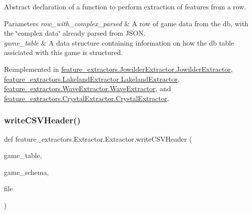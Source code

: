 Abstract declaration of a function to perform extraction of features from a row. 


\begin{DoxyParams}{Parameters}
{\em row\+\_\+with\+\_\+complex\+\_\+parsed} & A row of game data from the db, with the \char`\"{}complex data\char`\"{} already parsed from J\+S\+ON. \\
\hline
{\em game\+\_\+table} & A data structure containing information on how the db table assiciated with this game is structured. \\
\hline
\end{DoxyParams}


Reimplemented in \mbox{\hyperlink{classfeature__extractors_1_1_jowilder_extractor_1_1_jowilder_extractor_a02ab1ac9f1234341dc74610d4a5606d0}{feature\+\_\+extractors.\+Jowilder\+Extractor.\+Jowilder\+Extractor}}, \mbox{\hyperlink{classfeature__extractors_1_1_lakeland_extractor_1_1_lakeland_extractor_a1648b69f5bf98cad7a5c67a2c5be90f9}{feature\+\_\+extractors.\+Lakeland\+Extractor.\+Lakeland\+Extractor}}, \mbox{\hyperlink{classfeature__extractors_1_1_wave_extractor_1_1_wave_extractor_a3dbf40e07ac5c4c28037f331cc268798}{feature\+\_\+extractors.\+Wave\+Extractor.\+Wave\+Extractor}}, and \mbox{\hyperlink{classfeature__extractors_1_1_crystal_extractor_1_1_crystal_extractor_a916b4ecdb7842673f8f62d61732d5624}{feature\+\_\+extractors.\+Crystal\+Extractor.\+Crystal\+Extractor}}.

\mbox{\label{classfeature__extractors_1_1_extractor_1_1_extractor_a7cf66d598a6ec479e3f65db57ec454a0}} 
\subsubsection{\texorpdfstring{writeCSVHeader()}{writeCSVHeader()}}
{\footnotesize\ttfamily def feature\+\_\+extractors.\+Extractor.\+Extractor.\+write\+C\+S\+V\+Header (\begin{DoxyParamCaption}\item[{\mbox{\hyperlink{class_game_table_1_1_game_table}{Game\+Table}}}]{game\+\_\+table,  }\item[{\mbox{\hyperlink{classschemas_1_1_schema_1_1_schema}{Schema}}}]{game\+\_\+schema,  }\item[{typing.\+I\+O.\+writable}]{file }\end{DoxyParamCaption})\hspace{0.3cm}{\ttfamily [static]}}



